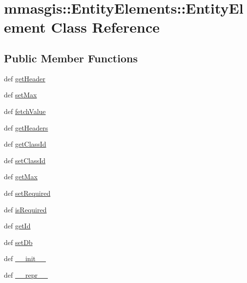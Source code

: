 \hypertarget{classmmasgis_1_1EntityElements_1_1EntityElement}{
\section{mmasgis::EntityElements::EntityElement Class Reference}
\label{classmmasgis_1_1EntityElements_1_1EntityElement}
}
\subsection*{Public Member Functions}
\begin{DoxyCompactItemize}
\item 
def \hyperlink{classmmasgis_1_1EntityElements_1_1EntityElement_a022545f2381b94187fb3ce52cee42657}{getHeader}
\item 
def \hyperlink{classmmasgis_1_1EntityElements_1_1EntityElement_ada9be649a0d09f1e3ac4ae77382020c7}{setMax}
\item 
def \hyperlink{classmmasgis_1_1EntityElements_1_1EntityElement_a8ca777474440f072d0e7498ffb47e656}{fetchValue}
\item 
def \hyperlink{classmmasgis_1_1EntityElements_1_1EntityElement_a14cb89c773b5eabe119b21d3719c34fa}{getHeaders}
\item 
def \hyperlink{classmmasgis_1_1EntityElements_1_1EntityElement_ada3ad2bca847116b4b0dd7152232ef3f}{getClassId}
\item 
def \hyperlink{classmmasgis_1_1EntityElements_1_1EntityElement_a463cba2590abed27e2f8a71bcb4e63d5}{setClassId}
\item 
def \hyperlink{classmmasgis_1_1EntityElements_1_1EntityElement_aa190677c21e57d43f126f74d3a43f852}{getMax}
\item 
def \hyperlink{classmmasgis_1_1EntityElements_1_1EntityElement_a15e4bf6873e8ab1ec9552b18e024e179}{setRequired}
\item 
def \hyperlink{classmmasgis_1_1EntityElements_1_1EntityElement_a2d2f61f4598bf40c8c16b732d431f72e}{isRequired}
\item 
def \hyperlink{classmmasgis_1_1EntityElements_1_1EntityElement_a783dc8cf51cb1ee047010c8cb3286ddd}{getId}
\item 
def \hyperlink{classmmasgis_1_1EntityElements_1_1EntityElement_ad170eeb5e21d293afa7fee3e7df19fbb}{setDb}
\item 
def \hyperlink{classmmasgis_1_1EntityElements_1_1EntityElement_a4087b581041f8f15860bfdc573f20b53}{\_\-\_\-init\_\-\_\-}
\item 
def \hyperlink{classmmasgis_1_1EntityElements_1_1EntityElement_aac7b7c7933050aa4d6b3b8d3b9b54d7e}{\_\-\_\-repr\_\-\_\-}
\end{DoxyCompactItemize}
